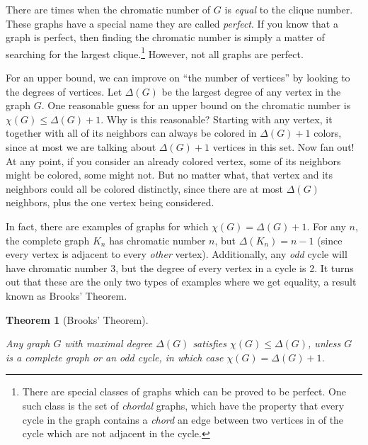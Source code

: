 \documentclass[10pt,]{book}
\theoremstyle{plain}
\newtheorem{theorem}{Theorem}[section]
\theoremstyle{definition}
\theoremstyle{definition}
\theoremstyle{definition}
\numberwithin{equation}{chapter}
\begin{document}
There are times when the chromatic number of \(G\) is \emph{equal} to the clique number. These graphs have a special name \textendash{} they are called \emph{perfect}. If you know that a graph is perfect, then finding the chromatic number is simply a matter of searching for the largest clique.\footnote{There are special classes of graphs which can be proved to be perfect.  One such class is the set of \emph{chordal} graphs, which have the property that every cycle in the graph contains a \emph{chord} \textendash{} an edge between two vertices in of the cycle which are not adjacent in the cycle.\label{fn-15}} However, not all graphs are perfect.
%
\par

For an upper bound, we can improve on ``the number of vertices'' by looking to the degrees of vertices. Let \(\Delta(G)\) be the largest degree of any vertex in the graph \(G\). One reasonable guess for an upper bound on the chromatic number is \(\chi(G) \le \Delta(G) + 1\). Why is this reasonable? Starting with any vertex, it together with all of its neighbors can always be colored in \(\Delta(G) + 1\) colors, since at most we are talking about \(\Delta(G) + 1\) vertices in this set. Now fan out! At any point, if you consider an already colored vertex, some of its neighbors might be colored, some might not. But no matter what, that vertex and its neighbors could all be colored distinctly, since there are at most \(\Delta(G)\) neighbors, plus the one vertex being considered.
%
\par

In fact, there are examples of graphs for which \(\chi(G) = \Delta(G) + 1\). For any \(n\), the complete graph \(K_n\) has chromatic number \(n\), but \(\Delta(K_n) = n-1\) (since every vertex is adjacent to every \emph{other} vertex). Additionally, any \emph{odd} cycle will have chromatic number 3, but the degree of every vertex in a cycle is 2. It turns out that these are the only two types of examples where we get equality, a result known as Brooks' Theorem.
%
\begin{theorem}[Brooks' Theorem]\label{theorem-7}

Any graph \(G\) with maximal degree \(\Delta(G)\) satisfies \(\chi(G) \le \Delta(G)\), unless \(G\) is a complete graph or an odd cycle, in which case \(\chi(G) = \Delta(G) + 1\).
%
\end{theorem}
\par
\end{document}
